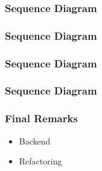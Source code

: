 \documentclass[aspectratio=169,10pt,t]{beamer}
\begin{document}
\begin{frame}[t]
	\frametitle{Sequence Diagram}
	\vspace{1cm}
	\begin{figure}[h]
		\centering
	\end{figure}
\end{frame}

\begin{frame}[t]
	\frametitle{Sequence Diagram}
	\begin{figure}[h]
		\centering
	\end{figure}
	
\end{frame}

\begin{frame}[t]
	\frametitle{Sequence Diagram}

	\begin{figure}[h]
		\centering
	\end{figure}
	
\end{frame}

\begin{frame}[t]
	\frametitle{Sequence Diagram}
	\begin{figure}[h]
		\centering
	\end{figure}
	
\end{frame}

\begin{frame}[t]
	\frametitle{Final Remarks}

	\begin{itemize}
		\item Backend
		\item Refactoring
	\end{itemize}
	
\end{frame}
\end{document}

